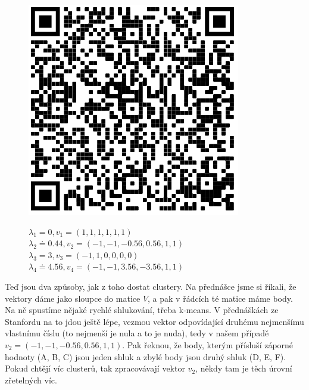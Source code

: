 \documentclass[10pt,a4paper]{article}
\begin{document}
\begin{figure}[H]
\centering
\begin{minipage}{0.15\textwidth}
\centering
\includegraphics[width=\textwidth]{img/spectral-clustering-qr}
\end{minipage} \hfill
\begin{minipage}{0.84\textwidth}

$\lambda_1 = 0, v_1 = (1, 1, 1, 1, 1, 1)$\\
$\lambda_2 \doteq 0.44, v_2 = (-1, -1, -0.56, 0.56, 1, 1)$\\
$\lambda_3 = 3, v_3 = (-1, 1, 0, 0, 0, 0)$\\
$\lambda_4 \doteq 4.56, v_4 = (-1, -1, 3.56, -3.56, 1, 1)$\\


\end{minipage}
\end{figure}

Teď jsou dva způsoby, jak z toho dostat clustery. Na přednášce jsme si říkali, že vektory dáme jako sloupce do matice $V$, a pak v řádcích té matice máme body. Na ně spustíme nějaké rychlé shlukování, třeba k-means. V přednáškách ze Stanfordu na to jdou ještě lépe, vezmou vektor odpovídající druhému nejmenšímu vlastnímu číslu (to nejmenší je nula a to je nuda), tedy v našem případě $v_2 = (-1, -1, -0.56, 0.56, 1, 1)$. Pak řeknou, že body, kterým přísluší záporné hodnoty (A, B, C) jsou jeden shluk a zbylé body jsou druhý shluk (D, E, F). Pokud chtějí víc clusterů, tak zpracovávají vektor $v_2$, někdy tam je těch úrovní zřetelných víc.
\end{document}
